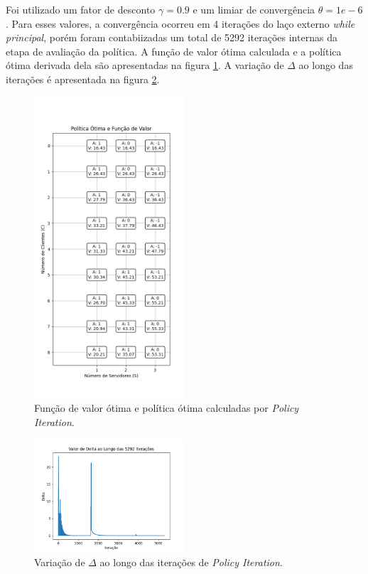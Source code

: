 Foi utilizado um fator de desconto $\gamma = 0.9$ e um limiar de convergência $\theta = 1e-6$. Para esses valores, a convergência ocorreu em 4 iterações do laço externo \textit{while principal}, porém foram contabiizadas um total de 5292 iterações internas da etapa de avaliação da política. A função de valor ótima calculada e a política ótima derivada dela são apresentadas na figura \ref{fig:policy_iteration_policy_and_values}. A variação de $\Delta$ ao longo das iterações é apresentada na figura \ref{fig:policy_iteration_delta}.

\begin{figure}[H]
    \centering
    \includegraphics[width=0.5\textwidth]{fig/policy_iteration_policy_and_values.png}
    \caption{Função de valor ótima e política ótima calculadas por \textit{Policy Iteration}.}
    \label{fig:policy_iteration_policy_and_values}
\end{figure}

\begin{figure}[H]
    \centering
    \includegraphics[width=0.5\textwidth]{fig/policy_iteration_delta.png}
    \caption{Variação de $\Delta$ ao longo das iterações de \textit{Policy Iteration}.}
    \label{fig:policy_iteration_delta}
\end{figure}

